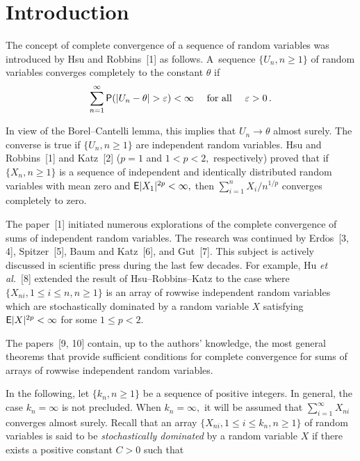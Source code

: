       \begin{multicols}{2}

            \label{st\stat}


\section{Introduction}

\noindent
The concept of complete convergence of a sequence of random variables was 
introduced by Hsu and Robbins~[1]
as follows. A~sequence $\{U_n, n\ge 1\}$ of random variables  converges completely 
to the constant $\theta$ if
$$ 
\sum\limits_{n=1}^{\infty}{\sf P}(|U_n-\theta |>\varepsilon)< \infty \quad 
\mbox{ for all }\quad \varepsilon> 0\,. 
$$

In view of the Borel--Cantelli lemma, this implies that $U_n \rightarrow \theta$ almost surely. 
The converse is true if $\{U_n, n \geq 1\}$ are independent random variables. 
Hsu and Robbins~[1] and Katz~[2] ($p=1$ and
$1< p <2,$ respectively) proved that if $\{X_n, n\ge 1\}$ is a sequence of independent and identically
distributed random variables with mean zero and ${\sf E}|X_1|^{2p}<\infty,$  
then $\sum\limits_{i=1}^n X_i/n^{1/p}$ converges
completely to zero.

The paper~[1] initiated numerous explorations of 
the complete convergence of sums of
independent random variables. The research was continued by Erd$\ddot{\mbox{o}}$s~[3, 4], 
Spitzer~[5], Baum and
Katz~[6], and Gut~[7]. This subject is actively discussed in scientific press during the last few decades.
For example, Hu {\it et al.}~[8] extended the result of Hsu--Robbins--Katz to the case where $\{X_{ni}, 1\le
i\le n, n\ge 1\}$ is an array of rowwise independent random variables which are stochastically dominated 
by a
random variable $X$ satisfying ${\sf E}|X|^{2p}<\infty$ for some $1\le p<2$.

The papers~[9, 10] contain, up to the authors' knowledge, the most general theorems
that provide sufficient conditions for complete convergence for sums of arrays of rowwise independent random
variables.

In the following, let $\{k_n, n\ge 1\}$ be a sequence of positive integers. In general,
the case $k_n=\infty$ is
not precluded. When $k_n=\infty,$ it will be assumed that $\sum\limits_{i=1}^\infty X_{ni}$ converges almost surely. Recall
that an array $\{X_{ni}, 1\le i\le k_n, n\ge 1\}$ of random variables is said to be {\it stochastically
dominated} by a random variable $X$ if there exists a positive constant $C>0$ such that


\end{multicols}
